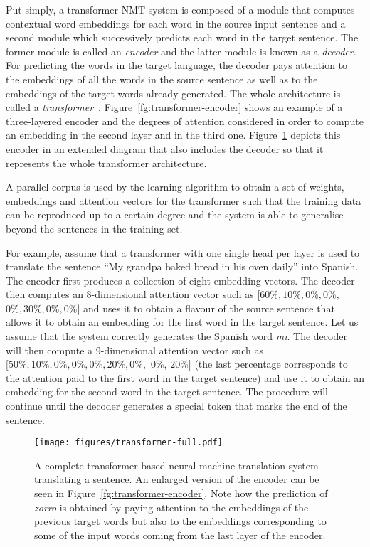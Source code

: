 \documentclass[output=paper,colorlinks,citecolor=brown]{langscibook}
\begin{document}
Put simply, a transformer NMT system is composed of a module that computes contextual word embeddings for each word in the source input sentence and a second module which successively predicts each word in the target sentence. The former module is called an \emph{encoder} and the latter module is known as a \emph{decoder}. For predicting the words in the target language, the decoder pays attention to the embeddings of all the words in the source sentence as well as to the embeddings of the target words already generated. The whole architecture is called a \emph{transformer}~\citep{transformer}. Figure~\ref{fg:transformer-encoder} shows an example of a three-layered encoder and the degrees of attention considered in order to compute an embedding in the second layer and in the third one. Figure~\ref{fg:transformer} depicts this encoder in an extended diagram that also includes the decoder so that it represents the whole transformer architecture.

A parallel corpus is used by the learning algorithm to obtain a set of weights, embeddings and attention vectors for the transformer such that the training data can be reproduced up to a certain degree and the system is able to generalise beyond the sentences in the training set.

For example, assume that a transformer with one single head per layer is used to translate the sentence ``My grandpa baked bread in his oven daily'' into Spanish. The encoder first produces a collection of eight embedding vectors. The decoder then computes an 8-dimensional attention vector such as 
$[60\%, 10\%, 0\%, 0\%,$ $0\%, 30\%, 0\%, 0\%]$ 
and uses it to obtain a flavour of the source sentence that allows it to obtain an embedding for the first word in the target sentence. 
Let us assume that the system correctly generates the Spanish word \emph{mi}. The decoder will then compute a 9-dimensional attention vector such as 
$[50\%, 10\%, 0\%, 0\%, 0\%, 20\%, 0\%,$ 0\%, $20\%]$
(the last percentage corresponds to the attention paid to the first word in the target sentence) and use it to obtain an embedding for the second word in the target sentence. The procedure will continue until the decoder generates a special token that marks the end of the sentence.

\begin{figure}[tb]
\centering
    \texttt{[image: figures/transformer-full.pdf]}
\caption{A complete transformer-based neural machine translation system translating a sentence. An enlarged version of the 
encoder
can be seen in Figure~\ref{fg:transformer-encoder}. Note how the prediction of \emph{zorro} is obtained by 
paying attention to 
the embeddings of the previous target words but also 
to
the embeddings corresponding to some of the input words coming from the last layer of the encoder.}
\label{fg:transformer}
\end{figure}
\end{document}
